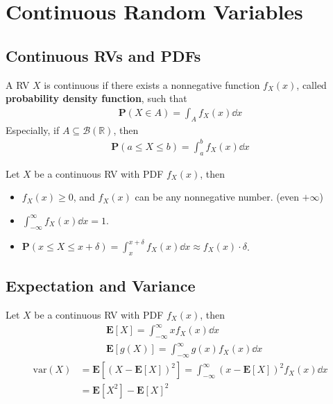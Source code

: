 \chapter{Continuous Random Variables}


\section{Continuous RVs and PDFs}

\begin{definition}
    A RV $X$ is continuous if there exists a nonnegative function $f_{X}(x)$, called \textbf{probability density function}, such that
    \begin{align}
        \mathbf{P}(X \in A) = \int_{A} f_{X}(x) \dd{x}
    \end{align}
    Especially, if $A \subseteq \mathcal{B}(\mathbb{R})$, then
    \begin{align}
        \mathbf{P}(a \leq X \leq b) = \int_{a}^{b} f_{X}(x) \dd{x}
    \end{align}
\end{definition}

\begin{property}
    Let $X$ be a continuous RV with PDF $f_{X}(x)$, then
    \begin{itemize}
        \item $f_{X}(x) \geq 0$, and $f_{X}(x)$ can be any nonnegative number. (even $+\infty$)
        \item $\int_{-\infty}^{\infty} f_{X}(x) \dd{x} = 1$.
        \item $\mathbf{P}(x \leq X \leq x + \delta) = \int_{x}^{x + \delta} f_{X}(x) \dd{x} \approx f_{X}(x) \cdot \delta$.
    \end{itemize}
\end{property}


\section{Expectation and Variance}

\begin{definition}
    Let $X$ be a continuous RV with PDF $f_{X}(x)$, then
    \begin{equation}
    \begin{aligned}
        &\mathbf{E}[X] = \int_{-\infty}^{\infty} x f_{X}(x) \dd{x} \\ 
        &\mathbf{E}[g(X)] = \int_{-\infty}^{\infty} g(x) f_{X}(x) \dd{x}
    \end{aligned}
    \end{equation}
    \begin{equation}
    \begin{aligned}
        \text{var}(X) &= \mathbf{E}[(X - \mathbf{E}[X])^{2}] = \int_{-\infty}^{\infty} (x - \mathbf{E}[X])^{2} f_{X}(x) \dd{x} \\ 
        &= \mathbf{E}[X^{2}] - \mathbf{E}[X]^{2}
    \end{aligned}
    \end{equation}
\end{definition}

